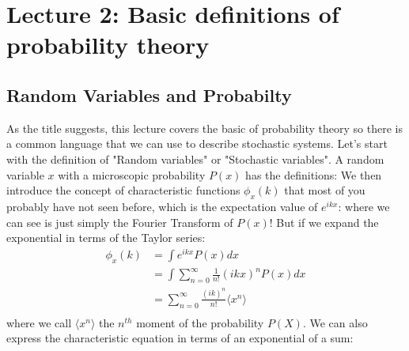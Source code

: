 \documentclass{report}
\begin{document}
%
%
\chapter{Lecture 2: Basic definitions of probability theory}
\section{Random Variables and Probabilty}

As the title suggests, this lecture covers the basic of probability theory so there is a common language that we can use to describe stochastic systems. Let's start with the definition of "Random variables" or "Stochastic variables". A random variable $x$ with a microscopic probability $P(x)$ has the definitions:
\noindent We then introduce the concept of characteristic functions $\phi_x(k)$ that most of you probably have not seen before, which is the expectation value of $e^{ikx}$:
\noindent where we can see is just simply the Fourier Transform of $P(x)$! But if we expand the exponential in terms of the Taylor series:
\begin{align}
    \phi_x(k) & = \int e^{ikx} P(x) dx                                      \\
              & = \int \sum_{n=0}^{\infty} \frac{1}{n!} (ikx)^n P(x) dx     \\
              & = \sum_{n=0}^{\infty} \frac{(ik)^n}{n!} \langle x^n \rangle \\
\end{align}
\noindent where we call $\langle x^n \rangle$ the $n^{th}$ moment of the probability $P(X)$.
\noindent We can also express the characteristic equation in terms of an exponential of a sum:
\end{document}
